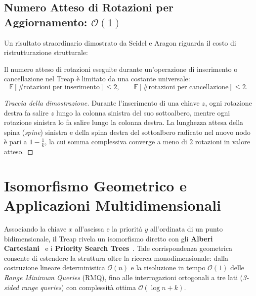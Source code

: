 \subsection{Numero Atteso di Rotazioni per Aggiornamento: $\mathcal{O}(1)$}
Un risultato straordinario dimostrato da Seidel e Aragon riguarda il costo di ristrutturazione strutturale:

\begin{theorem}
Il numero atteso di rotazioni eseguite durante un'operazione di inserimento o cancellazione nel Treap \`e limitato da una costante universale:
\begin{equation}
  \mathbb{E}[\# \text{rotazioni per inserimento}] \le 2, \qquad \mathbb{E}[\# \text{rotazioni per cancellazione}] \le 2.
\end{equation}
\end{theorem}

\begin{proof}[Traccia della dimostrazione]
Durante l'inserimento di una chiave $z$, ogni rotazione destra fa salire $z$ lungo la colonna sinistra del suo sottoalbero, mentre ogni rotazione sinistra lo fa salire lungo la colonna destra. La lunghezza attesa della spina (\textit{spine}) sinistra e della spina destra del sottoalbero radicato nel nuovo nodo \`e pari a $1 - \frac{1}{k}$, la cui somma complessiva converge a meno di $2$ rotazioni in valore atteso.
\end{proof}

\FloatBarrier
\section{Isomorfismo Geometrico e Applicazioni Multidimensionali}
\label{sec:geometric-applications}

Associando la chiave $x$ all'ascissa e la priorit\`a $y$ all'ordinata di un punto bidimensionale, il Treap rivela un isomorfismo diretto con gli \textbf{Alberi Cartesiani}~\cite{vuillemin1980} e i \textbf{Priority Search Trees}~\cite{mccreight1985}. Tale corrispondenza geometrica consente di estendere la struttura oltre la ricerca monodimensionale: dalla costruzione lineare deterministica $\mathcal{O}(n)$ e la risoluzione in tempo $\mathcal{O}(1)$ delle \textit{Range Minimum Queries} (RMQ), fino alle interrogazioni ortogonali a tre lati (\textit{3-sided range queries}) con complessit\`a ottima $\mathcal{O}(\log n + k)$.

